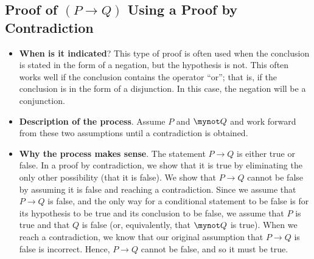 \subsection*{Proof of  $\left( P \to Q \right)$ Using a Proof by Contradiction}
%
%

\begin{itemize}
\item \textbf{When is it indicated}?  This type of proof is often used when the  conclusion is stated in the form of a negation, but the hypothesis is not.  This often works well if the conclusion contains the operator ``or'';  that is, if the conclusion is in the form of a disjunction.  In this case, the negation will be a conjunction.

\item \textbf{Description of the process}.  Assume  $P$  and $\mynot Q$   and work forward from these two assumptions until a contradiction is obtained.

\item \textbf{Why the process makes sense}.  The statement  $P \to Q$
  is either true or false.  In a proof by contradiction, we show that it is true by eliminating the only other possibility (that it is false).  We show that  $P \to Q$
  cannot be false by assuming it is false and reaching a contradiction.  Since we assume that  $P \to Q$
  is false, and the only way for a conditional statement to be false is for its hypothesis to be true and its conclusion to be false,  we assume that  $P$ is true and that  $Q$  is false (or, equivalently, that  $\mynot  Q$
  is true).  When we reach a contradiction, we know that our original assumption that  $P \to Q$
  is false is incorrect.  Hence,  $P \to Q$
  cannot be false, and so it must be true.
\end{itemize}
